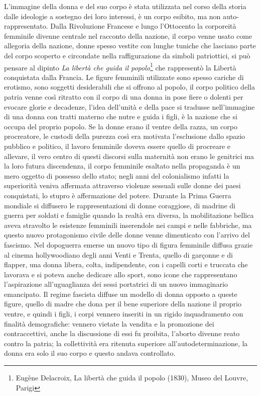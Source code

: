 L'immagine della donna e del suo corpo è stata utilizzata nel corso della storia dalle ideologie a sostegno dei loro interessi, è un corpo esibito, ma non auto-rappresentato.
Dalla Rivoluzione Francese e lungo l'Ottocento la corporeità femminile divenne centrale nel racconto della nazione, il corpo venne usato come allegoria della nazione, donne spesso vestite con lunghe tuniche che lasciano parte del corpo scoperto e circondate nella raffigurazione da simboli patriottici, si può pensare al dipinto \textit{La libertà che guida il popolo}\footnote{Eugène Delacroix, La libertà che guida il popolo (1830), Museo del Louvre, Parigi} che rappresentò la Libertà conquistata dalla Francia.
Le figure femminili utilizzate sono spesso cariche di erotismo, sono soggetti desiderabili che si offrono al popolo, il corpo politico della patria venne così ritratto con il corpo di una donna in pose fiere o dolenti per evocare glorie e decadenze, l'idea dell'unità e della pace si tradusse nell'immagine di una donna con tratti materno che nutre e guida i figli, è la nazione che si occupa del proprio popolo.
Se la donne erano il ventre della razza, un corpo procreatore, le custodi della purezza così era motivata l'esclusione dallo spazio pubblico e politico, il lavoro femminile doveva essere quello di procreare e allevare, il vero centro di questi discorsi sulla maternità non erano le genitrici ma la loro futura discendenza, il corpo femminile esaltato nella propaganda è un mero oggetto di possesso dello stato; negli anni del colonialismo infatti la superiorità veniva affermata attraverso violenze sessuali sulle donne dei paesi conquistati, lo stupro è affermazione del potere.
Durante la Prima Guerra mondiale si diffusero le rappresentazioni di donne coraggiose, di madrine di guerra per soldati e famiglie quando la realtà era diversa, la mobilitazione bellica aveva stravolto le esistenze femminili inserendole nei campi e nelle fabbriche, ma questo nuovo protagonismo civile delle donne venne dimenticato con l'arrivo del fascismo.
Nel dopoguerra emerse un nuovo tipo di figura femminile diffusa grazie al cinema hollywoodiano degli anni Venti e Trenta, quello di garçonne e di flapper, una donna libera, colta, indipendente, con i capelli corti e truccata che lavorava e si poteva anche dedicare allo sport, sono icone che rappresentano l'aspirazione all'uguaglianza dei sessi portatrici di un nuovo immaginario emancipato.
Il regime fascista diffuse un modello di donna opposto a queste figure, quello di madre che dona per il bene superiore della nazione il proprio ventre, e quindi i figli, i corpi vennero inseriti in un rigido inquadramento con finalità demografiche: vennero vietate la vendita e la promozione dei contraccettivi, anche la discussione di essi fu proibita, l'aborto divenne reato contro la patria; la collettività era ritenuta superiore all'autodeterminazione, la donna era solo il suo corpo e questo andava controllato.
